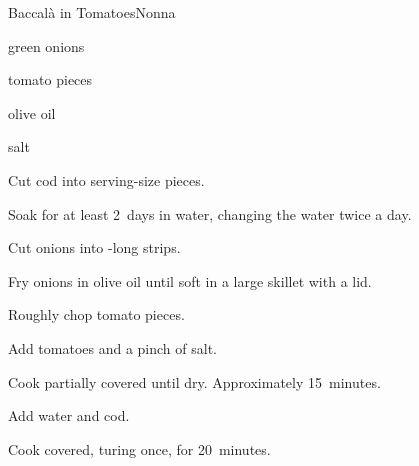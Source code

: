 \begin{recipe}{Baccal\`a in Tomatoes}{Nonna}{}

\begin{ingredients}
\item green onions
\item {}
\item tomato pieces
\item olive oil
\item salt
\end{ingredients}

\begin{directions}
\item Cut cod into serving-size pieces.
\item Soak for at least 2~days in water, changing the water twice a day.
\item Cut onions into -long strips.
\item Fry onions in olive oil until soft in a large skillet with a lid.
\item Roughly chop tomato pieces.
\item Add tomatoes and a pinch of salt.
\item Cook partially covered until dry. Approximately 15~minutes.
\item Add \C{\threequarter} water and cod.
\item Cook covered, turing once, for 20~minutes.
\end{directions}

\end{recipe}
